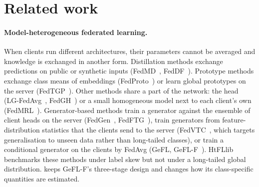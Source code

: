 \section{Related work}\label{sec:related}

\paragraph{Model-heterogeneous federated learning.} When clients run different architectures, their parameters cannot
be averaged and knowledge is exchanged in another form. Distillation methods exchange predictions on public or
synthetic inputs (FedMD~\cite{li2019fedmd}, FedDF~\cite{lin2020feddf}). Prototype methods exchange class means of
embeddings (FedProto~\cite{tan2022fedproto}) or learn global prototypes on the server (FedTGP~\cite{zhang2024fedtgp}).
Other methods share a part of the network: the head (LG-FedAvg~\cite{liang2020lgfedavg}, FedGH~\cite{yi2023fedgh}) or a
small homogeneous model next to each client's own (FedMRL~\cite{yi2024fedmrl}). Generator-based methods train a
generator against the ensemble of client heads on the server (FedGen~\cite{zhu2021fedgen},
FedFTG~\cite{zhang2022fedftg}), train generators from feature-distribution statistics that the clients send to the
server (FedVTC~\cite{niu2026fedvtc}, which targets generalisation to unseen data rather than long-tailed classes), or
train a conditional
generator on the clients by FedAvg (GeFL, GeFL-F~\cite{kang2025gefl}). HtFLlib~\cite{zhang2025htfllib} benchmarks these
methods under label skew but not under a long-tailed global distribution. \ours keeps GeFL-F's three-stage design and
changes how its class-specific quantities are estimated.


